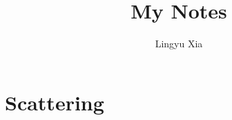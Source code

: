 \documentclass[10pt, a4paper]{book}
\title{My Notes}
\author{Lingyu Xia}
\begin{document}
\maketitle

\tableofcontents

\newpage

\section{Scattering}
\end{document}
